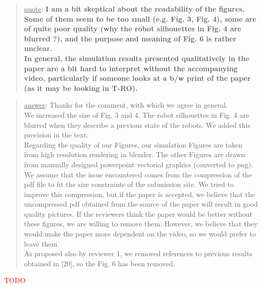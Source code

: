 \documentclass[a4paper]{article}
\newcommand{\ndone}[0]{\textcolor{red}{TODO}}
\newcommand\quot[1]{\begin{quote} \underline{quote}: \textbf{#1}\end{quote}}
\newcommand\as[1]{\begin{quote} \underline{answer}: {#1}\end{quote} }
\begin{document}
\quot{I am a bit skeptical about the readability of the figures. Some of them seem to be too small (e.g. Fig. 3, Fig. 4), some are of quite poor quality (why the robot silhouettes in Fig. 4 are blurred ?), and the purpose and meaning of Fig. 6 is rather unclear. \\ In general, the simulation results presented qualitatively in the paper are a bit hard to interpret without the accompanying video, particularly if someone looks at a b/w print of the paper (as it may be looking in T-RO).}
\as{Thanks for the comment, with which we agree in general.  \\We increased the size of Fig. 3 and 4. The robot silhouettes in Fig. 4 are blurred when they describe a previous state of the robots. We added this precision in the text. \\Regarding the quality of our Figures,  our simulation Figures are taken from high resolution rendering in blender. The other Figures are drawn from manually designed powerpoint vectorial graphics (converted to png). We assume that the issue encountered comes from the compression of the pdf file to fit the size constraints of the 
submission site. We tried to improve this compression, but if the paper is accepted, we believe that the uncompressed pdf obtained from the source of the paper will result in good quality pictures. If the reviewers think the paper would be better without these figures, we are willing to remove them. However, we believe that they would make the paper more dependent on the video, so we would prefer to leave them. \\ As proposed also by reviewer 1, we removed references to previous results obtained in [20], so the Fig. 6 has been removed.}\ndone

\end{document}
